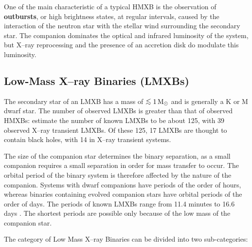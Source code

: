\vspace{\myparskip}

One of the main characteristic of a typical HMXB is the observation of
\textbf{outbursts}, or high brightness states, at regular intervals,
caused by the interaction of the neutron star with the stellar wind
surrounding the
secondary star. The companion dominates the optical and infrared
luminosity of the system, but X--ray reprocessing and the presence of an accretion disk do modulate
this luminosity. %


\subsection{Low-Mass X--ray Binaries (LMXBs)}\label{cha:Introduction:sec:X--rayBinaries:subsec:LMXBs}

The secondary star of an LMXB has a mass of $\lsim 1\,\mathrm{M}\sun$
and is generally a K or M dwarf star. The number of observed LMXBs is greater than that of observed HMXBs: %
estimate the number of known LMXBs to be about 125, with 39 observed
X--ray transient LMXBs. Of these 125, 17 LMXBs are thought to contain black holes, with 14 in X--ray transient systems. %

\vspace{\myparskip}

The size of the companion star determines the binary separation, as a
small companion requires a small separation in order for mass transfer to
occur. The orbital period of the binary system is therefore affected by the
nature of the companion. Systems with dwarf companions have
periods of the order of hours, whereas binaries containing evolved
companion stars have orbital periods of the order of days. The periods of known LMXBs range from 11.4 minutes to 16.6 days %
\cite{VanParadijs:1995}. %
The shortest periods are possible only because of the low mass of the
companion star. %

\vspace{\myparskip}

The category of Low Mass X--ray Binaries can be divided into two
sub-categories:


